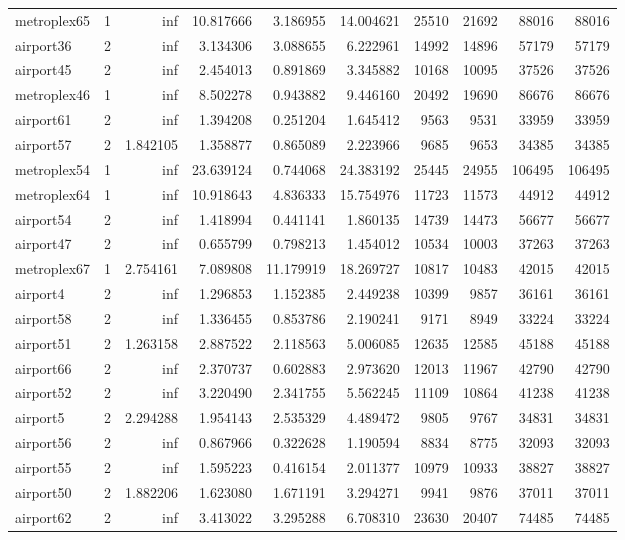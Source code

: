 \begin{longtable}{|l|r|r|r|r|r|r|r|r|r|}
metroplex65 & 1 & inf & 10.817666 & 3.186955 & 14.004621 & 25510 & 21692 & 88016 & 88016 \\
airport36 & 2 & inf & 3.134306 & 3.088655 & 6.222961 & 14992 & 14896 & 57179 & 57179 \\
airport45 & 2 & inf & 2.454013 & 0.891869 & 3.345882 & 10168 & 10095 & 37526 & 37526 \\
metroplex46 & 1 & inf & 8.502278 & 0.943882 & 9.446160 & 20492 & 19690 & 86676 & 86676 \\
airport61 & 2 & inf & 1.394208 & 0.251204 & 1.645412 & 9563 & 9531 & 33959 & 33959 \\
airport57 & 2 & 1.842105 & 1.358877 & 0.865089 & 2.223966 & 9685 & 9653 & 34385 & 34385 \\
metroplex54 & 1 & inf & 23.639124 & 0.744068 & 24.383192 & 25445 & 24955 & 106495 & 106495 \\
metroplex64 & 1 & inf & 10.918643 & 4.836333 & 15.754976 & 11723 & 11573 & 44912 & 44912 \\
airport54 & 2 & inf & 1.418994 & 0.441141 & 1.860135 & 14739 & 14473 & 56677 & 56677 \\
airport47 & 2 & inf & 0.655799 & 0.798213 & 1.454012 & 10534 & 10003 & 37263 & 37263 \\
metroplex67 & 1 & 2.754161 & 7.089808 & 11.179919 & 18.269727 & 10817 & 10483 & 42015 & 42015 \\
airport4 & 2 & inf & 1.296853 & 1.152385 & 2.449238 & 10399 & 9857 & 36161 & 36161 \\
airport58 & 2 & inf & 1.336455 & 0.853786 & 2.190241 & 9171 & 8949 & 33224 & 33224 \\
airport51 & 2 & 1.263158 & 2.887522 & 2.118563 & 5.006085 & 12635 & 12585 & 45188 & 45188 \\
airport66 & 2 & inf & 2.370737 & 0.602883 & 2.973620 & 12013 & 11967 & 42790 & 42790 \\
airport52 & 2 & inf & 3.220490 & 2.341755 & 5.562245 & 11109 & 10864 & 41238 & 41238 \\
airport5 & 2 & 2.294288 & 1.954143 & 2.535329 & 4.489472 & 9805 & 9767 & 34831 & 34831 \\
airport56 & 2 & inf & 0.867966 & 0.322628 & 1.190594 & 8834 & 8775 & 32093 & 32093 \\
airport55 & 2 & inf & 1.595223 & 0.416154 & 2.011377 & 10979 & 10933 & 38827 & 38827 \\
airport50 & 2 & 1.882206 & 1.623080 & 1.671191 & 3.294271 & 9941 & 9876 & 37011 & 37011 \\
airport62 & 2 & inf & 3.413022 & 3.295288 & 6.708310 & 23630 & 20407 & 74485 & 74485 \\

\end{longtable}
